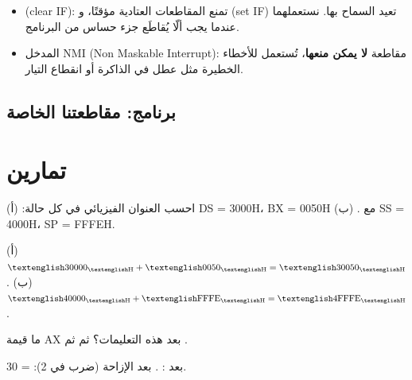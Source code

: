 \begin{tarif}
    \begin{itemize}
        \item {} \textenglish{(clear IF)}: تمنع المقاطعات العتادية مؤقتًا، و \textenglish{(set IF)} تعيد السماح بها.
              نستعملهما عندما يجب ألّا يُقاطَع جزء حساس من البرنامج.
        \item المدخل \textenglish{NMI} \textenglish{(Non Maskable Interrupt)}: مقاطعة \textbf{لا يمكن منعها}، تُستعمل للأخطاء الخطيرة
              مثل عطل في الذاكرة أو انقطاع التيار.
    \end{itemize}
\end{tarif}

\subsection{برنامج: مقاطعتنا الخاصة}

\begin{sharh}
\end{sharh}

\section{تمارين}

\begin{tamrin}
    احسب العنوان الفيزيائي في كل حالة: (أ) \textenglish{DS = 3000H}، \textenglish{BX = 0050H} مع .
    (ب) \textenglish{SS = 4000H}، \textenglish{SP = FFFEH}.
\end{tamrin}
\begin{hall}
    (أ) $\hex{30000} + \hex{0050} = \hex{30050}$. \quad (ب) $\hex{40000} + \hex{FFFE} = \hex{4FFFE}$.
\end{hall}

\begin{tamrin}
    ما قيمة \textenglish{AX} بعد هذه التعليمات؟  ثم  ثم .
\end{tamrin}
\begin{hall}
    بعد : . بعد الإزاحة (ضرب في 2): \textenglish{ = 30}.
\end{hall}

